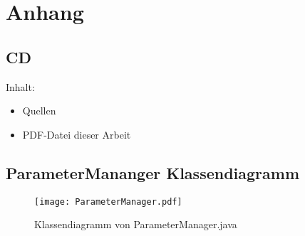 
\chapter{Anhang}

		
\section{CD}
Inhalt:
\begin{itemize}
\item Quellen
\item PDF-Datei dieser Arbeit
\end{itemize}


\newpage
\section{ParameterMananger Klassendiagramm}\label{A.PM.Diagramm}
\begin{figure}[h!]
  \begin{center}
    \texttt{[image: ParameterManager.pdf]}
  		  \caption{Klassendiagramm von ParameterManager.java}
     \label{ttn.DoorsConnetor}
  \end{center}
\end{figure}

%
%		
%
